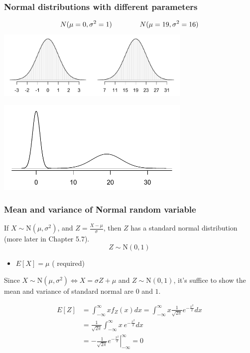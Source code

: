 \documentclass[slidestop,compress,mathserif]{beamer}
\begin{document}

\begin{frame}
\frametitle{Normal distributions with different parameters}

\vspace{-1cm}
\begin{center}
\[N(\mu = 0, \sigma^2 = 1) \hspace{1.4cm} N(\mu = 19, \sigma^2 = 16) \]
\includegraphics[width=0.7\textwidth]{figures/twoSampleNormals}
\end{center}

\begin{center}
\includegraphics[width=0.7\textwidth]{figures/twoSampleNormalsStacked}
\end{center}

\end{frame}

\begin{frame}\frametitle{Mean and variance of Normal random variable}
If $X \sim \text{N}(\mu, \sigma^2)$, and $Z = \frac{X - \mu}{\sigma}$, then $Z$ has a standard normal distribution (more later in Chapter 5.7).
\[ Z \sim \text{N}(0, 1) \]


\begin{itemize}
\item $E[X] = \mu$ ({\color{red} required})
\end{itemize}



\hspace{0.5cm}
Since $X \sim \text{N}(\mu, \sigma^2) \Longleftrightarrow X = \sigma Z + \mu$ and $Z \sim \text{N}(0, 1)$,
it's suffice to show the mean and variance of standard normal are $0$ and $1$.

{\footnotesize{
\begin{align*}
E[Z] & = \int_{-\infty}^{\infty} x f_Z(x) dx = \int_{-\infty}^{\infty} x \frac{1}{\sqrt{2\pi}} e^{-\frac{x^2}{2}}dx\\
& = \frac{1}{\sqrt{2\pi}}\int_{-\infty}^{\infty} x~e^{-\frac{x^2}{2}}dx\\
& = -\frac{1}{\sqrt{2\pi}}\left. e^{-\frac{x^2}{2}}\right|_{-\infty}^{\infty} = 0
\end{align*}
}}

\end{frame}
\end{document}
